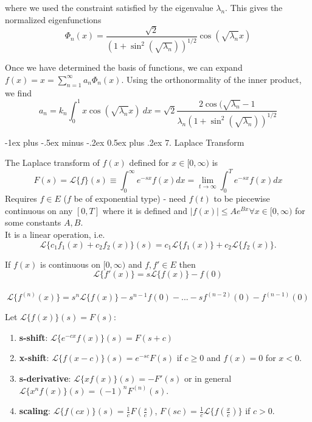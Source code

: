 \documentclass[10pt,landscape]{article}
\makeatletter
\renewcommand{\section}{\@startsection{section}{1}{0mm}%
                                {-1ex plus -.5ex minus -.2ex}%
                                {0.5ex plus .2ex}%
                                {\normalfont\large\bfseries}}
\makeatother
\begin{document}
\begin{multicols}{2}
where we used the constraint satisfied by the eigenvalue $\lambda_n$. This gives the normalized eigenfunctions \\ 

$$\Phi_n(x) = \frac{\sqrt{2}}{(1+\sin^2(\sqrt{\lambda_n}))^{1/2}}\cos(\sqrt{\lambda_n}x)$$


Once we have determined the basis of functions, we can expand $f(x) = x = \sum_{n=1}^\infty a_n\Phi_n(x).$ Using the orthonormality of the inner product, we find \\$$a_n = k_n\int_0^1x\cos(\sqrt{\lambda_n}x) \ dx = \sqrt{2}\frac{2\cos(\sqrt{\lambda_n} - 1}{\lambda_n(1+\sin^2(\sqrt{\lambda_n}))^{1/2}}$$


\bigskip 



\section{7. Laplace Transform}

The Laplace transform of $f(x)$ defined for $x\in [0, \infty)$ is \\$$ F(s) = \mathcal{L}\{f\}(s) \equiv \int_0^\infty e^{-sx} f(x) dx = \lim_{t \rightarrow \infty} \int_0^T e^{-sx}f(x)dx$$ Requires $f \in E$ ($f$ be of exponential type) - need $f(t)$ to be piecewise continuous on any $[0,T]$ where it is defined and $|f(x)| \le Ae^{Bx} \forall x \in [0,\infty)$ for some constants $A,B$. \\
It is a linear operation, i.e. \\$$\mathcal{L} \{c_1f_1(x) + c_2f_2(x)\}(s) = c_1 \mathcal{L} \{f_1(x)\} + c_2 \mathcal{L} \{f_2(x)\} .$$

If $f(x)$ is continuous on $[0,\infty)$ and $f,f' \in  E$ then \\ $$ \mathcal{L} \{f'(x)\} = s\mathcal{L}\{f(x)\} - f(0)$$\\
$$ \mathcal{L} \{f^{(n)}(x)\} = s^n\mathcal{L}\{f(x)\} - s^{n-1}f(0)-...-sf^{(n-2)}(0) - f^{(n-1)}(0)$$

Let $\mathcal{L}\{f(x)\}(s) = F(s)$:
\begin{enumerate}
 	\item \textbf{s-shift}:  $\mathcal{L}\{e^{-cx}f(x)\}(s) = F(s+c)$
	\item \textbf{x-shift}:  $\mathcal{L}\{f(x-c)\}(s) = e^{-sc} F(s)$ if $c\ge 0$ and $f(x)=0$ for $x<0$.
	\item \textbf{s-derivative}:  $\mathcal{L}\{xf(x)\}(s) = -F'(s)$ or in general $\mathcal{L}\{x^nf(x)\}(s) = (-1)^nF^{(n)}(s)$.
	\item \textbf{scaling}:  $\mathcal{L}\{f(cx)\}(s) = \frac{1}{c}F(\frac{s}{c})$,  $F(sc) = \frac{1}{c} \mathcal{L}\{f\left(\frac{x}{c}\right)\}$ if $c > 0$.


\end{enumerate}
\end{multicols}
\end{document}
